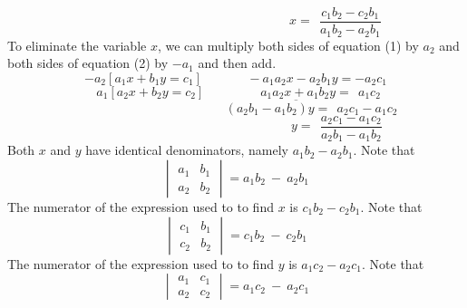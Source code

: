 \documentclass{article}
\begin{document}
\begin{flushleft}
\[ \ \ \ \ \ \ \ \ \ \ \ \ \ \ \ \ \ \ \ \ \ \ \ \ \ \ \ \ \ \ \ \ \ \ \ \ \ \ \ \ \ \ \ \ \ \ \ \ \ \ \ \ \ \ \ \ \ \ \ \ \ \ \ \ \ \ \ \ \ \ \ x = \ \ \frac{c_1b_2 - c_2b_1}{a_1b_2 - a_2b_1} \]
\linebreak
\linebreak
To eliminate the variable $x$, we can multiply both sides of equation (1) by $a_2$ and both sides of equation (2) by $-a_1$ and then add.
\linebreak
\linebreak
\[ -a_2[a_1x + b_1y = c_1] \ \ \ \ \ \ \ \ \ \ \ \ \ \ \ \ -a_1a_2x - a_2b_1y = -a_2c_1 \]
\[ \ \ a_1[a_2x + b_2y = c_2] \ \ \ \ \ \ \ \ \ \ \ \ \ \ \ \ \ \ \ \ a_1a_2x + a_1b_2y = \ \ a_1c_2 \]
\[ \ \ \ \ \ \ \ \ \ \ \ \ \ \ \ \ \ \ \ \ \ \ \ \ \ \ \ \ \ \ \ \ \ \ \ \ \ \ \ \ \ \ \ \overline{\ \ \ \ \ \ \ \ \ \ \ (a_2b_1 - a_1b_2)y = \ \ a_2c_1 - a_1c_2}\]
\[ \ \ \ \ \ \ \ \ \ \ \ \ \ \ \ \ \ \ \ \ \ \ \ \ \ \ \ \ \ \ \ \ \ \ \ \ \ \ \ \ \ \ \ \ \ \ \ \ \ \ \ \ \ \ \ \ \ \ \ \ \ \ \ \ \ \ \ \ \ \ \ \ y = \ \ \frac{a_2c_1 - a_1c_2}{a_2b_1 - a_1b_2} \]
\linebreak
\linebreak
Both $x$ and $y$ have identical denominators, namely $a_1b_2 - a_2b_1$. Note that \[ \begin{vmatrix} a_{1} & b_{1} \\ a_{2} & b_{2}\end{vmatrix} = a_{1}b_{2} \ - \ a_{2}b_{1} \]
\linebreak
\linebreak
The numerator of the expression used to to find $x$ is $c_1b_2 - c_2b_1$. Note that
\[ \begin{vmatrix} c_{1} & b_{1} \\ c_{2} & b_{2}\end{vmatrix} = c_{1}b_{2} \ - \ c_{2}b_{1} \]
\linebreak
\linebreak
The numerator of the expression used to to find $y$ is $a_1c_2 - a_2c_1$. Note that
\[ \begin{vmatrix} a_{1} & c_{1} \\ a_{2} & c_{2}\end{vmatrix} = a_{1}c_{2} \ - \ a_{2}c_{1} \]
\linebreak
\linebreak

\end{flushleft}
\end{document}
